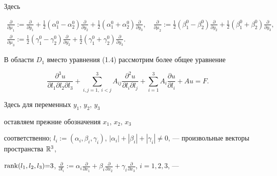 Здесь


\begin{gather*}


\frac{\partial}{\partial \mu_1}:=\frac{\partial}{\partial{y_1}}+


\frac{1}{2}(\alpha_1^0-\alpha_2^0)\frac{\partial}{\partial{y_2}}+\frac{1}{2}


(\alpha_1^0+\alpha_2^0)\frac{\partial}{\partial{y_3}},\quad\frac{\partial}


{\partial{\mu_2}}:=\frac{1}{2}(\beta_1^0-\beta_2^0)\frac{\partial}


{\partial{y_2}}+


\frac{1}{2}(\beta_1^0+\beta_2^0)\frac{\partial}{\partial{y_3}},


\\


\frac{\partial}{\partial{\mu_3}}:=\frac{1}{2}(\gamma_1^0-\gamma_2^0)


\frac{\partial}{\partial{y_2}}+\frac{1}{2}(\gamma_1^0+\gamma_2^0)


\frac{\partial}{\partial{y_3}}.


\end{gather*}


В области $D_1$ вместо уравнения (1.4) рассмотрим более общее уравнение




\begin{equation}


\frac{\partial^{3}u}{\partial l_1 \partial l_2 \partial l_3}+


\sum_{i,j=1,\;i<j}^{3}A_{ij}\frac{\partial^{2}u}{\partial l_i \partial l_j}+


\sum_{i=1}^{3}A_i\frac{\partial u}{\partial l_i}+Au=F.


\end{equation}


Здесь для переменных $y_1$, $y_2$, $y_3$


оставляем прежние обозначения $x_1$, $x_2$, $x_3$


соответственно; $l_i:=(\alpha_i,\beta_i,\gamma_i)$, $|\alpha_i|+|\beta_i|+


|\gamma_i| \neq 0$, --- произвольные векторы пространства $\Bbb{R}^3 $,


$\rank (l_1,l_2,l_3){=}3$, $\frac{\partial}{\partial l_i}:=\alpha_i


\frac{\partial}{\partial x_1}+\beta_i \frac{\partial}{\partial x_2}+\gamma_i


\frac{\partial}{\partial x_3}$, $i=1,2,3$, ---


